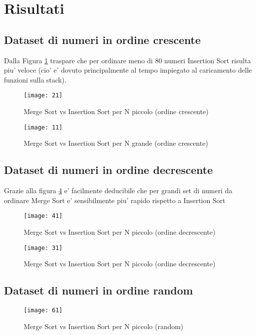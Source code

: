 \documentclass[a4paper]{article}
\begin{document}
\newpage
\section{Risultati}
\subsection{Dataset di numeri in ordine crescente}
Dalla Figura \ref{fig:SmallInsMergeCresc} traspare che per ordinare meno di 80 numeri Insertion Sort risulta piu' veloce (cio' e' dovuto principalmente al tempo impiegato al caricamento delle funzioni sulla stack).	

 
		\begin{figure}[!htb]
		\centering
		\texttt{[image: 21]}
		\caption{Merge Sort vs Insertion Sort per N piccolo (ordine crescente)}
		\label{fig:SmallInsMergeCresc}
		\end{figure}
		
		\begin{figure}[!htb]
		\centering
		\texttt{[image: 11]}
		\caption{Merge Sort vs Insertion Sort per N grande (ordine crescente)}
		\label{fig:BigInsMergeCresc}
		\end{figure}
		

\newpage		
\subsection{Dataset di numeri in ordine decrescente}
Grazie alla figura \ref{fig:BigInsMergeDecr} e' facilmente deducibile che per grandi set di numeri da ordinare Merge Sort  e' sensibilmente piu' rapido rispetto a Insertion Sort 
 
		\begin{figure}[!htb]
		\centering
		\texttt{[image: 41]}
		\caption{Merge Sort vs Insertion Sort per N piccolo (ordine decrescente)}
		\label{fig:SmallInsMergeDecr}
		\end{figure}
		
		\begin{figure}[!htb]
		\centering
		\texttt{[image: 31]}
		\caption{Merge Sort vs Insertion Sort per N piccolo (ordine decrescente)}
		\label{fig:BigInsMergeDecr}
		\end{figure}
\newpage		
\subsection{Dataset di numeri in ordine random}		

		\begin{figure}[!htb]
		\centering
		\texttt{[image: 61]}
		\caption{Merge Sort vs Insertion Sort per N piccolo (random)}
		\label{fig:SmallInsMergeRandom}
		\end{figure}
		
\end{document}
